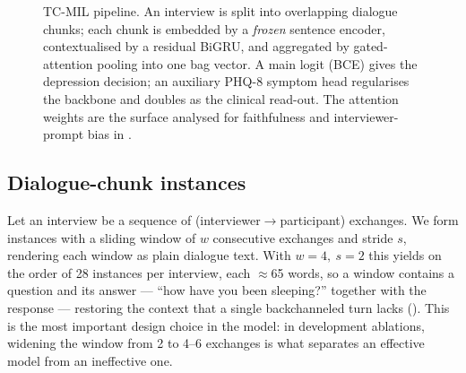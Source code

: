 \documentclass[conference]{IEEEtran}
\begin{document}
\begin{figure}[t]
{}
\caption{TC-MIL pipeline. An interview is split into overlapping dialogue
chunks; each chunk is embedded by a
\emph{frozen} sentence encoder, contextualised by a residual BiGRU, and
aggregated by gated-attention pooling into one bag vector. A main logit (BCE) gives the depression decision; an auxiliary PHQ-8
symptom head regularises the backbone and doubles as the clinical read-out.
The attention weights are the surface analysed for faithfulness and
interviewer-prompt bias in .}
\label{fig:arch}
\end{figure}

\subsection{Dialogue-chunk instances}
Let an interview be a sequence of (interviewer$\rightarrow$participant)
exchanges. We form instances with a sliding window of $w$ consecutive
exchanges and stride $s$, rendering each window as plain dialogue text. With
$w=4,\ s=2$ this yields on the order of 28 instances per interview, each
$\approx$65 words, so a window contains a question and its answer ---
``how have you been sleeping?'' together with the response --- restoring the
context that a single backchanneled turn lacks (). This is the
most important design choice in the model: in development ablations, widening
the window from 2 to 4--6 exchanges is what separates an effective model from an
ineffective one.
\end{document}
